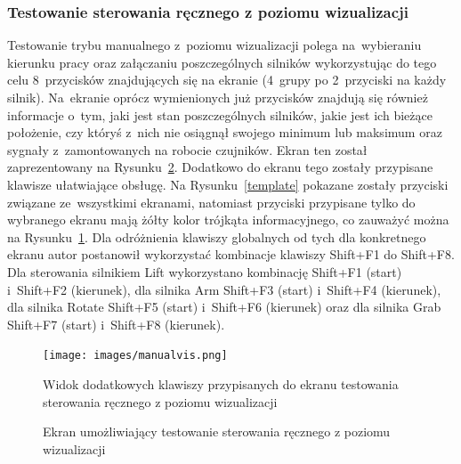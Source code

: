 \subsubsection{Testowanie sterowania ręcznego z poziomu wizualizacji}
Testowanie trybu manualnego z~poziomu wizualizacji polega na~wybieraniu kierunku pracy oraz załączaniu poszczególnych silników wykorzystując do tego celu 8~przycisków znajdujących się na ekranie (4~grupy po 2~przyciski na każdy silnik). Na~ekranie oprócz wymienionych już przycisków znajdują się również informacje o~tym, jaki jest stan poszczególnych silników, jakie jest ich bieżące położenie, czy któryś z~nich nie osiągnął swojego minimum lub maksimum oraz sygnały z~zamontowanych na robocie czujników. Ekran ten został zaprezentowany na Rysunku~\ref{vis4}.
Dodatkowo do ekranu tego zostały przypisane klawisze ułatwiające obsługę. Na Rysunku~\ref{template} pokazane zostały przyciski związane ze~wszystkimi ekranami, natomiast przyciski przypisane tylko do wybranego ekranu mają żółty kolor trójkąta informacyjnego, co zauważyć można na Rysunku~\ref{manvis}. Dla odróżnienia klawiszy globalnych od tych dla konkretnego ekranu autor postanowił wykorzystać kombinacje klawiszy Shift+F1 do Shift+F8. Dla sterowania silnikiem Lift wykorzystano kombinację Shift+F1 (start) i~Shift+F2 (kierunek), dla silnika Arm Shift+F3 (start) i~Shift+F4 (kierunek), dla silnika Rotate Shift+F5 (start) i~Shift+F6 (kierunek) oraz dla silnika Grab Shift+F7 (start) i~Shift+F8 (kierunek).
\begin{figure}[!htb] 	\centering 	\texttt{[image: images/manualvis.png]} 	\caption{Widok dodatkowych klawiszy przypisanych do ekranu testowania sterowania ręcznego z poziomu wizualizacji} \label{manvis} \end{figure}
\begin{figure}[!htb]
\centering 	
\caption{Ekran umożliwiający testowanie sterowania ręcznego z poziomu wizualizacji} 
\label{vis4}
\end{figure}
